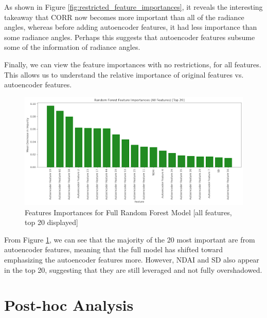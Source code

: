 \documentclass[10pt,letterpaper]{article}
\begin{document}
As shown in Figure \ref{fig:restricted_feature_importances}, it reveals the interesting takeaway that CORR now becomes more important than all of the radiance angles, whereas before adding autoencoder features, it had less importance than some radiance angles. Perhaps this suggests that autoencoder features subsume some of the information of radiance angles.

Finally, we can view the feature importances with no restrictions, for all features. This allows us to understand the relative importance of original features vs. autoencoder features.

\begin{figure}[ht]
    \centering
    \includegraphics[width=0.5\linewidth]{figs/full_model_all_feature_importances.png}
    \caption{Features Importances for Full Random Forest Model [all features, top 20 displayed]}
    \label{fig:all_feature_importances}
\end{figure}

From Figure \ref{fig:all_feature_importances}, we can see that the majority of the 20 most important are from autoencoder features, meaning that the full model has shifted toward emphasizing the autoencoder features more. However, NDAI and SD also appear in the top 20, suggesting that they are still leveraged and not fully overshadowed.

\section{Post-hoc Analysis}


\end{document}
